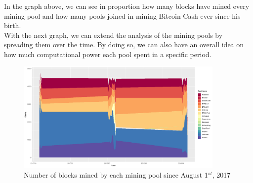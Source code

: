 In the graph above, we can see in proportion how many blocks have mined every mining pool and
how many pools joined in mining Bitcoin Cash ever since his birth.\\
With the next graph, we can extend the analysis of the mining pools by spreading them over the time.
By doing so, we can also have an overall idea on how much computational power each pool spent 
in a specific period.

\begin{figure}[h]
    \centering
    \includegraphics[width = 0.9\textwidth]{stackblocks.png}
    \caption{Number of blocks mined by each mining pool since August 1$^{st}$, 2017}
    \label{fig:request}
\end{figure}